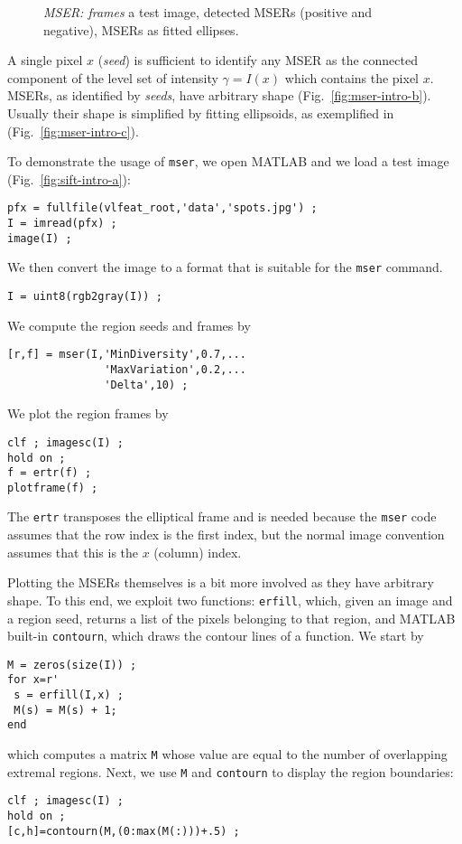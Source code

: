 \documentclass[9.5pt]{article}
\newcommand{\cmd}  [1]{{\color{red}\tt   #1}}
\begin{document}
\begin{figure*}[t]
\hfill
{}
\hfill
{}
\caption{{\em MSER: frames} \protect{} a test
  image, \protect{} detected MSERs (positive
  and negative), \protect{} MSERs as fitted
  ellipses.}
\label{fig:mser-intro}
\end{figure*}

A single pixel $x$ ({\em seed}) is sufficient to identify any MSER as
the connected component of the level set of intensity $\gamma=I(x)$
which contains the pixel $x$. MSERs, as identified by {\em seeds},
have arbitrary shape (Fig.~\ref{fig:mser-intro-b}). Usually their
shape is simplified by fitting ellipsoids, as exemplified in
(Fig.~\ref{fig:mser-intro-c}).

To demonstrate the usage of \cmd{mser}, we open MATLAB and we load a
test image (Fig.~\ref{fig:sift-intro-a}):
\begin{verbatim}
pfx = fullfile(vlfeat_root,'data','spots.jpg') ;
I = imread(pfx) ;
image(I) ; 
\end{verbatim}
We then convert the image to a format that is suitable for the
\cmd{mser} command.
\begin{verbatim}
I = uint8(rgb2gray(I)) ;
\end{verbatim}
We compute the region seeds and frames by
\begin{verbatim}
[r,f] = mser(I,'MinDiversity',0.7,...
               'MaxVariation',0.2,...
               'Delta',10) ;
\end{verbatim}
We plot the region frames by
\begin{verbatim}
clf ; imagesc(I) ; 
hold on ;
f = ertr(f) ;
plotframe(f) ;
\end{verbatim}
The \cmd{ertr} transposes the elliptical frame and is needed because
the \cmd{mser} code assumes that the row index is the first index, but
the normal image convention assumes that this is the $x$ (column)
index.

Plotting the MSERs themselves is a bit more involved as they have
arbitrary shape.  To this end, we exploit two functions: \cmd{erfill},
which, given an image and a region seed, returns a list of the pixels
belonging to that region, and MATLAB built-in \cmd{contourn}, which
draws the contour lines of a function. We start by
\begin{verbatim}
M = zeros(size(I)) ;
for x=r'
 s = erfill(I,x) ;
 M(s) = M(s) + 1;
end
\end{verbatim}
which computes a matrix \verb$M$ whose value are equal to the number
of overlapping extremal regions. Next, we use \verb$M$ and
\cmd{contourn} to display the region boundaries:
\begin{verbatim}
clf ; imagesc(I) ;
hold on ;
[c,h]=contourn(M,(0:max(M(:)))+.5) ;
\end{verbatim}
\end{document}
